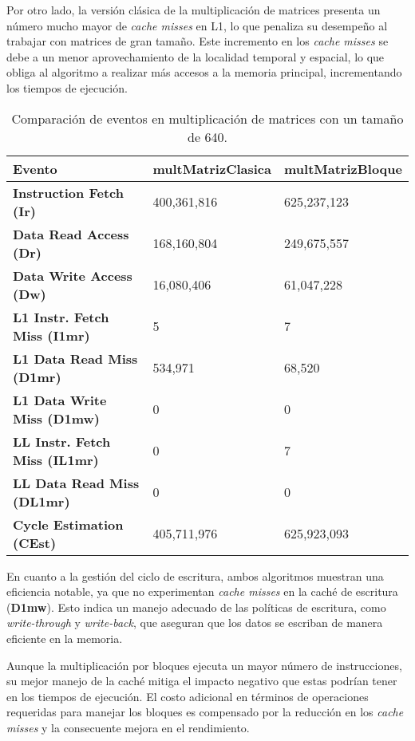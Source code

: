 \documentclass[conference]{IEEEtran}
\begin{document}
Por otro lado, la versión clásica de la multiplicación de matrices presenta un número mucho mayor de \textit{cache misses} en L1, lo que penaliza su desempeño al trabajar con matrices de gran tamaño. Este incremento en los \textit{cache misses} se debe a un menor aprovechamiento de la localidad temporal y espacial, lo que obliga al algoritmo a realizar más accesos a la memoria principal, incrementando los tiempos de ejecución.
\begin{table}[h!]
    \centering
    \begin{tabularx}{250pt}{|X|X|X|}
    \hline
    \textbf{Evento} & \textbf{multMatrizClasica} & \textbf{multMatrizBloque} \\ \hline
    \textbf{Instruction Fetch (Ir)} & 400,361,816 & 625,237,123 \\ \hline
    \textbf{Data Read Access (Dr)} & 168,160,804 & 249,675,557 \\ \hline
    \textbf{Data Write Access (Dw)} & 16,080,406 & 61,047,228 \\ \hline
    \textbf{L1 Instr. Fetch Miss (I1mr)} & 5 & 7 \\ \hline
    \textbf{L1 Data Read Miss (D1mr)} & 534,971 & 68,520 \\ \hline
    \textbf{L1 Data Write Miss (D1mw)} & 0 & 0 \\ \hline
    \textbf{LL Instr. Fetch Miss (IL1mr)} & 0 & 7 \\ \hline
    \textbf{LL Data Read Miss (DL1mr)} & 0 & 0 \\ \hline
    \textbf{Cycle Estimation (CEst)} & 405,711,976 & 625,923,093 \\ \hline
    \end{tabularx}
    \caption{Comparación de eventos en multiplicación de matrices con un tamaño de 640.}
    \label{Tabla3}
    \end{table}
    

    
En cuanto a la gestión del ciclo de escritura, ambos algoritmos muestran una eficiencia notable, ya que no experimentan \textit{cache misses} en la caché de escritura (\textbf{D1mw}). Esto indica un manejo adecuado de las políticas de escritura, como \textit{write-through} y \textit{write-back}, que aseguran que los datos se escriban de manera eficiente en la memoria.

Aunque la multiplicación por bloques ejecuta un mayor número de instrucciones, su mejor manejo de la caché mitiga el impacto negativo que estas podrían tener en los tiempos de ejecución. El costo adicional en términos de operaciones requeridas para manejar los bloques es compensado por la reducción en los \textit{cache misses} y la consecuente mejora en el rendimiento.    
\end{document}
